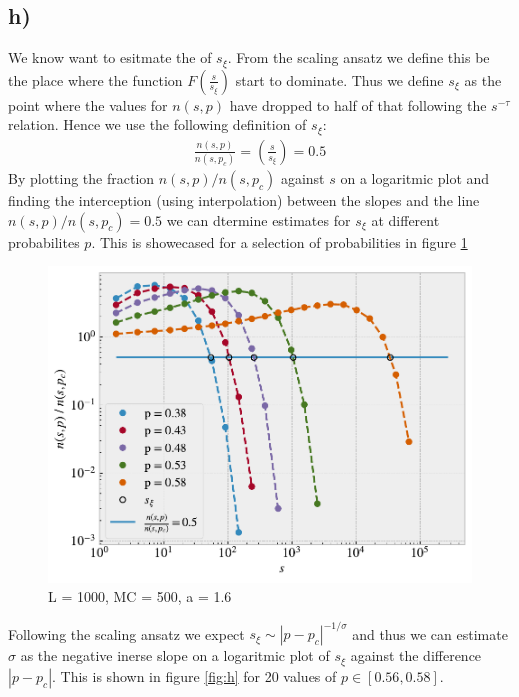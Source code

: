\documentclass[reprint, amsmath, amssymb, aps]{revtex4-2}
\begin{document}
\subsection*{h)}
We know want to esitmate the of $s_\xi$. From the scaling ansatz we define this be the place where the function $F\left(\frac{s}{s_\xi}\right)$ start to dominate. Thus we define $s_\xi$ as the point where the values for $n(s,p)$ have dropped to half of that following the $s^{-\tau}$ relation. Hence we use the following definition of $s_\xi$:
\begin{align*}
  \frac{n(s,p)}{n(s,p_c)} = \left(\frac{s}{s_\xi}\right) = 0.5
\end{align*}
By plotting the fraction $n(s,p)/n(s,p_c)$ against $s$ on a logaritmic plot and finding the interception (using interpolation) between the slopes and the line $n(s,p)/n(s,p_c) = 0.5 $ we can dtermine estimates for $s_\xi$ at different probabilites $p$. This is showecased for a selection of probabilities in figure \ref{fig:h_n_over_nc.pdf}
\begin{figure}[H]
  \includegraphics[width=\linewidth]{figures/h_n_over_nc.pdf}
  \caption{L = 1000, MC = 500, a = 1.6}
  \label{fig:h_n_over_nc.pdf}
\end{figure}
Following the scaling ansatz we expect $s_\xi \sim |p-p_c|^{-1/\sigma}$ and thus we can estimate $\sigma$ as the negative inerse slope on a logaritmic plot of $s_\xi$ against the difference $|p-p_c|$. This is shown in figure \ref{fig:h} for 20 values of $p \in [0.56, 0.58]$.
\end{document}
